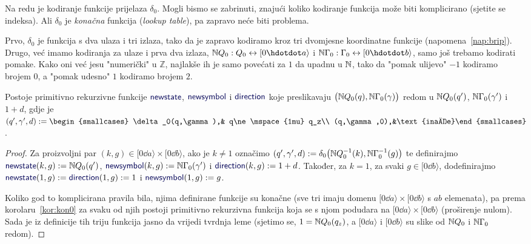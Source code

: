 Na redu je kodiranje funkcije prijelaza $\delta_0$. Mogli bismo se zabrinuti, znajući koliko kodiranje funkcija može biti komplicirano (sjetite se indeksa). Ali $\delta_0$ je \emph{konačna} funkcija (\emph{lookup table}), pa zapravo neće biti problema.

Prvo, $\delta_0$ je funkcija s dva ulaza i tri izlaza, tako da je zapravo kodiramo kroz tri dvomjesne koordinatne funkcije (napomena~\ref{nap:brip}). Drugo, već imamo kodiranja za ulaze i prva dva izlaza, $\N Q_0:Q_0\leftrightarrow[0\dd a\rangle$ i $\N\Gamma_0:\Gamma_0\leftrightarrow[0\dd b\rangle$, samo još trebamo kodirati pomake. Kako oni već jesu "numerički" u $\mathbb Z$, najlakše ih je samo povećati za $1$ da upadnu u ${\mathbb N}$, tako da "pomak ulijevo" $-1$ kodiramo brojem $0$, a "pomak udesno" $1$ kodiramo brojem $2$.

\begin{lema}[{name=[primitivna rekurzivnost funkcije prijelaza]}]\label{lm:newssdprn}
Postoje primitivno rekurzivne funkcije $\f{newstate}$, $\f{newsymbol}$ i $\f{direction}$ koje preslikavaju $\bigl({\mathbb N} Q_0(q),{\mathbb N}\Gamma_0(\gamma)\bigr)$ redom u ${\mathbb N} Q_0(q')$, ${\mathbb N}\Gamma_0(\gamma')$ i $1+d$, gdje je
$(q',\gamma',d):=\begin{smallcases}
	\delta_0(q,\gamma),& q\ne\mspace{1mu} q_z\\
(q,\gamma,0),&\text{inače}\end{smallcases}\!$.
\end{lema}
\begin{proof}
Za proizvoljni par $(k,g)\in[0\dd a\rangle\times[0\dd b\rangle$, ako je $k\ne 1$ označimo $(q',\gamma',d):=\delta_0\bigl({\mathbb N} Q_0^{-1}(k),{\mathbb N}\Gamma_0^{-1}(g)\bigr)$ te definirajmo $\f{newstate}(k,g):=\N Q_0(q')$, $\f{newsymbol}(k,g):=\N\Gamma_0(\gamma')$ i $\f{direction}(k,g):=1+d$. Također, za $k=1$, za svaki $g\in[0\dd b\rangle$, dodefinirajmo $\f{newstate}(1,g):=\f{direction}(1,g):=1$ i $\f{newsymbol}(1,g):=g$.

Koliko god to komplicirana pravila bila, njima definirane funkcije su konačne (sve tri imaju domenu $[0\dd a\rangle\times[0\dd b\rangle$ s $ab$ elemenata), pa prema korolaru~\ref{kor:kon0} za svaku od njih postoji primitivno rekurzivna funkcija koja se s njom podudara na $[0\dd a\rangle\times[0\dd b\rangle$ (proširenje nulom). Sada je iz definicije tih triju funkcija jasno da vrijedi tvrdnja leme (sjetimo se, $1={\mathbb N} Q_0(q_z)$, a $[0\dd a\rangle$ i $[0\dd b\rangle$ su slike od ${\mathbb N} Q_0$ i ${\mathbb N}\Gamma_0$ redom).
\end{proof}

